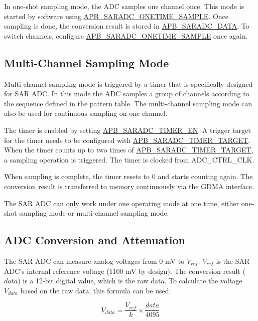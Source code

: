 \documentclass[main\_\_EN.tex]{subfiles}
\begin{document}
In one-shot sampling mode, the ADC samples one channel once. This mode is started by software using \hyperref[fielddesc:APBSARADCONETIMESAMPLE]{APB\_SARADC\_ONETIME\_SAMPLE}. Once sampling is done, the conversion result is stored in \hyperref[fielddesc:APBSARADCDATA]{APB\_SARADC\_DATA}. To switch channels, configure \hyperref[fielddesc:APBSARADCONETIMESAMPLE]{APB\_SARADC\_ONETIME\_SAMPLE} once again.

\subsection{Multi-Channel Sampling Mode}

Multi-channel sampling mode is triggered by a timer that is specifically designed for SAR ADC. In this mode the ADC samples a group of channels according to the sequence defined in the pattern table. The multi-channel sampling mode can also be used for continuous sampling on one channel.

The timer is enabled by setting \hyperref[fielddesc:APBSARADCTIMEREN]{APB\_SARADC\_TIMER\_EN}. A trigger target for the timer needs to be configured with \hyperref[fielddesc:APBSARADCTIMERTARGET]{APB\_SARADC\_TIMER\_TARGET}. When the timer counts up to two times of \hyperref[fielddesc:APBSARADCTIMERTARGET]{APB\_SARADC\_TIMER\_TARGET}, a sampling operation is triggered. The timer is clocked from ADC\_CTRL\_CLK.

When sampling is complete, the timer resets to 0 and starts counting again. The conversion result is transferred to memory continuously via the GDMA interface.

\begin{tiplisting}
The SAR ADC can only work under one operating mode at one time, either one-shot sampling mode or multi-channel sampling mode.
\end{tiplisting}

\subsection{ADC Conversion and Attenuation}

The SAR ADC can measure analog voltages from 0 mV to \(V_{ref}\). \(V_{ref}\) is the SAR ADC's internal reference voltage (1100 mV by design). The conversion result (\(data\)) is a 12-bit digital value, which is the raw data. To calculate the voltage \(V_{data}\) based on the raw data, this formula can be used:

    \[
    V_{data} = \frac{V_{ref}}{k}\times{\frac{data}{4095}}
    \]
\end{document}
